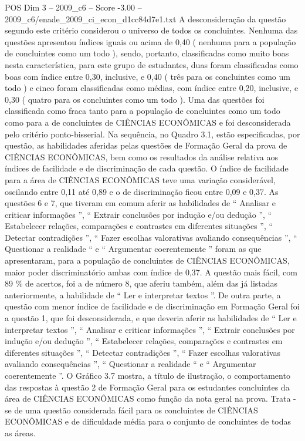 \begin{textsample}{POS Dim 3 – 2009\_c6 – Score -3.00 – 2009\_c6/enade\_2009\_ci\_econ\_d1cc84d7e1.txt}
A desconsideração da questão segundo este critério considerou o universo de todos os concluintes.
Nenhuma das questões apresentou índices iguais ou acima de 0,40 ( nenhuma para a população de concluintes como um todo ), sendo, portanto, classificadas como muito boas nesta característica, para este grupo de estudantes, duas foram classificadas como boas com índice entre 0,30, inclusive, e 0,40 ( três para os concluintes como um todo ) e cinco foram classificadas como médias, com índice entre 0,20, inclusive, e 0,30 ( quatro para os concluintes como um todo ).
Uma das questões foi classificada como fraca tanto para a população de concluintes como um todo como para a de concluintes de CIÊNCIAS ECONÔMICAS e foi desconsiderada pelo critério ponto-bisserial.
Na sequência, no Quadro 3.1, estão especificadas, por questão, as habilidades aferidas pelas questões de Formação Geral da prova de CIÊNCIAS ECONÔMICAS, bem como os resultados da análise relativa aos índices de facilidade e de discriminação de cada questão.
O índice de facilidade para a área de CIÊNCIAS ECONÔMICAS teve uma variação considerável, oscilando entre 0,11 até 0,89 e o de discriminação ficou entre 0,09 e 0,37.
As questões 6 e 7, que tiveram em comum aferir as habilidades de “ Analisar e criticar informações ”, “ Extrair conclusões por indução e/ou dedução ”, “ Estabelecer relações, comparações e contrastes em diferentes situações ”, “ Detectar contradições ”, “ Fazer escolhas valorativas avaliando consequências ”, “ Questionar a realidade “ e “ Argumentar coerentemente ” foram as que apresentaram, para a população de concluintes de CIÊNCIAS ECONÔMICAS, maior poder discriminatório ambas com índice de 0,37.
A questão mais fácil, com 89 \% de acertos, foi a de número 8, que aferiu também, além das já listadas anteriormente, a habilidade de “ Ler e interpretar textos ”.
De outra parte, a questão com menor índice de facilidade e de discriminação em Formação Geral foi a questão 1, que foi desconsiderada, e que deveria aferir as habilidades de “ Ler e interpretar textos ”, “ Analisar e criticar informações ”, “ Extrair conclusões por indução e/ou dedução ”, “ Estabelecer relações, comparações e contrastes em diferentes situações ”, “ Detectar contradições ”, “ Fazer escolhas valorativas avaliando consequências ”, “ Questionar a realidade “ e “ Argumentar coerentemente ”.
O Gráfico 3.7 mostra, a título de ilustração, o comportamento das respostas à questão 2 de Formação Geral para os estudantes concluintes da área de CIÊNCIAS ECONÔMICAS como função da nota geral na prova.
Trata -se de uma questão considerada fácil para os concluintes de CIÊNCIAS ECONÔMICAS e de dificuldade média para o conjunto de concluintes de todas as áreas.

\end{textsample}
